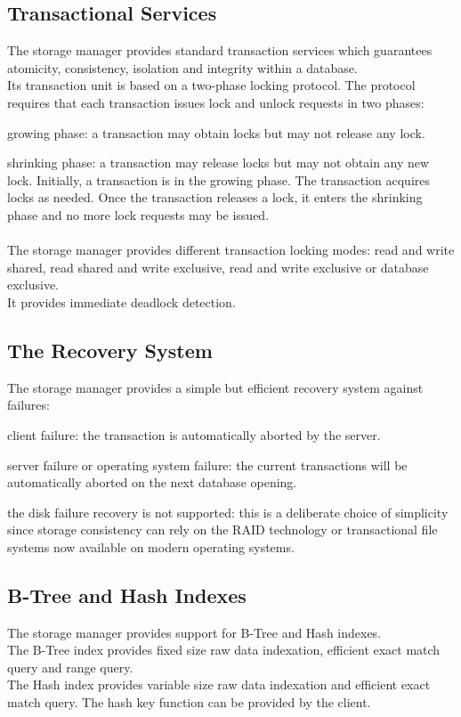 \subsection{Transactional Services}
  The storage manager provides standard transaction services which
  guarantees atomicity,  consistency, isolation and integrity within
  a database.
\\
  Its transaction unit is based on a two-phase locking protocol.
  The protocol requires that each transaction issues lock and unlock requests
  in two phases:
\bi
\item growing phase: a transaction may obtain locks but may not release
any lock.
\item shrinking phase: a transaction may release locks but may not obtain
any new lock.
\ei
Initially, a transaction is in the growing phase. The transaction acquires
locks as needed. Once the transaction releases a lock, it enters the
shrinking phase and no more lock requests may be issued.
\\
\\
The storage manager provides different transaction locking modes:
read and write shared,
read shared and write exclusive, read and write exclusive or
database exclusive.
\\
It provides immediate deadlock detection.
\subsection{The Recovery System}
The storage manager provides a simple but efficient recovery system against
failures:
\bi
\item client failure: the transaction is automatically aborted by the server.
\item server failure or operating system failure: the current transactions
  will be automatically aborted on the next database opening.
\item the disk failure recovery is not supported: this is a deliberate
choice of simplicity since storage consistency
can rely on the RAID technology or transactional file systems now available
on modern operating systems.
\ei

\subsection{B-Tree and Hash Indexes}
The storage manager provides support for B-Tree and Hash indexes.
\\
The B-Tree index provides fixed size raw data indexation,
efficient exact match query and range query.
\\
The Hash index provides variable size raw data indexation
and efficient exact match query. The hash key function can
be provided by the client.

